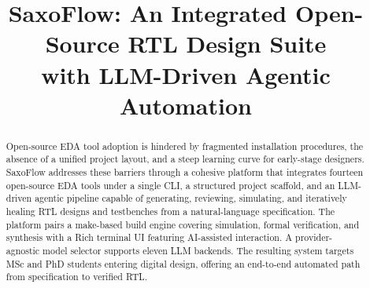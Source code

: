 
\title{SaxoFlow: An Integrated Open-Source \ac{RTL} Design Suite\\
       with \ac{LLM}-Driven Agentic Automation}

\author{
}

\maketitle

\begin{abstract}
Open-source \ac{EDA} tool adoption is hindered by fragmented installation
procedures, the absence of a unified project layout, and a steep learning curve
for early-stage designers. SaxoFlow addresses these barriers through a
cohesive platform that integrates fourteen open-source \ac{EDA} tools under a
single \ac{CLI}, a structured project scaffold, and an \ac{LLM}-driven agentic
pipeline capable of generating, reviewing, simulating, and iteratively healing
\ac{RTL} designs and testbenches from a natural-language specification. The
platform pairs a make-based build engine covering simulation, formal
verification, and synthesis with a Rich terminal \ac{UI} featuring AI-assisted
interaction. A provider-agnostic model selector supports eleven \ac{LLM}
backends. The resulting system targets \ac{MSc} and \ac{PhD} students entering
digital design, offering an end-to-end automated path from specification to
verified \ac{RTL}.
\end{abstract}


